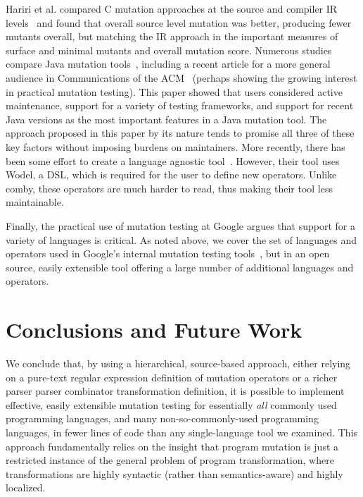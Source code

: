 \documentclass[acmsmall,screen,review,anonymous]{acmart}
\begin{document}
{Hariri et al. compared C mutation approaches at the source and
compiler IR levels~\cite{CompareSrcBinary} and found that overall
source level mutation was better, producing fewer mutants overall, but
matching the IR approach in the important measures of surface and
minimal mutants and overall mutation score.  Numerous studies compare
Java mutation tools~\cite{MajorPIT,gopinath2017does}, including a
recent article for a more general audience in Communications of the
ACM~\cite{CommACMJavaTool} (perhaps showing the growing interest in
practical mutation testing).  This paper showed that users
considered active maintenance, support for a variety of testing
frameworks, and support for recent Java versions as the most important
features in a Java mutation tool.  The approach proposed in this paper
by its nature tends to promise all three of these key factors without
imposing burdens on maintainers. More recently, there has been some effort to create a 
language agnostic tool~\cite{wodeltest}. However, their tool uses Wodel, a DSL, which 
is required for the user to define new operators. Unlike comby, these operators are much harder to read, thus 
making their tool less maintainable.

Finally, the practical use of mutation testing at Google argues that
support for a variety of languages is critical.  As noted above, we
cover the set of languages and operators used in Google's internal
mutation testing tools~\cite{PetrovicMutationGoogle}, but in an open
source, easily extensible tool offering a large number of additional
languages and operators.


\section{Conclusions and Future Work}

We conclude that, by using a hierarchical, source-based approach,
either relying on a pure-text regular expression definition of
mutation operators or a richer parser parser combinator transformation
definition, it is possible to implement effective, easily extensible
mutation testing for essentially \emph{all} commonly used programming
languages, and many non-so-commonly-used programming languages, in
fewer lines of code than any single-language tool we examined.  This
approach fundamentally relies on the insight that program mutation is
just a restricted instance of the general problem of program
transformation, where transformations are highly syntactic (rather
than semantics-aware) and highly localized.

}
\end{document}
